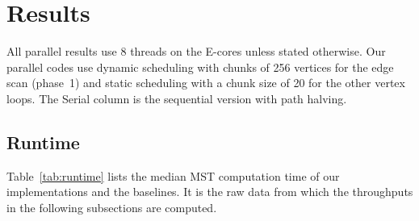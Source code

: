 \documentclass[11pt,a4paper]{article}
\begin{document}
\section*{Results}
All parallel results use 8 threads on the E-cores unless stated otherwise. Our parallel codes use dynamic scheduling with chunks of 256 vertices for the edge scan (phase~1) and static scheduling with a chunk size of 20 for the other vertex loops. The Serial column is the sequential version with path halving.

\subsection*{Runtime}
Table~\ref{tab:runtime} lists the median MST computation time of our implementations and the baselines. It is the raw data from which the throughputs in the following subsections are computed.
 
\end{document}
